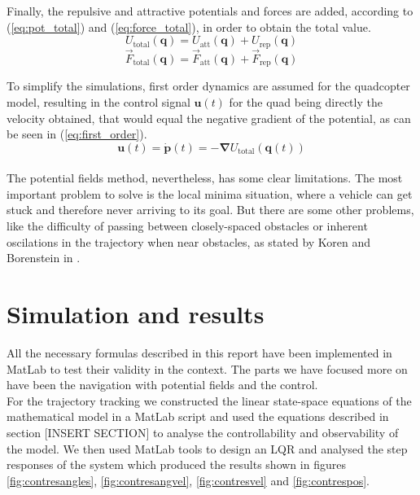 \documentclass[journal]{IEEEtran}
\newcommand*{\subb}[1]{_{\mathrm{#1}}}
\begin{document}
	Finally, the repulsive and attractive potentials and forces are added, according to (\ref{eq:pot_total}) and (\ref{eq:force_total}), in order to obtain the total value. 
	\begin{equation} \label{eq:pot_total}
	U\subb{total}(\bm{q}) = U\subb{att}(\bm{q}) + U\subb{rep}(\bm{q})
	\end{equation}
	\begin{equation} \label{eq:force_total}
	\vec{F}\subb{total}(\bm{q}) = \vec{F}\subb{att}(\bm{q}) + \vec{F}\subb{rep}(\bm{q})
	\end{equation}
	
	To simplify the simulations, first order dynamics are assumed for the quadcopter model, resulting in the control signal $\bm{u}(t)$ for the quad being directly the velocity obtained, that would equal the negative gradient of the potential, as can be seen in (\ref{eq:first_order}).
	\begin{equation} \label{eq:first_order}
	\bm{u}(t) = \bm{\dot p}(t) = -\bm{\nabla}U\subb{total}(\bm{q}(t))
	\end{equation}
	\\
	The potential fields method, nevertheless, has some clear limitations. The most important problem to solve is the local minima situation, where a vehicle can get stuck and therefore never arriving to its goal. But there are some other problems, like the difficulty of passing between closely-spaced obstacles or inherent oscilations in the trajectory when near obstacles, as stated by Koren and Borenstein in \cite{koren_pot_fields_limitations}. 
	
	\section{Simulation and results}
	All the necessary formulas described in this report have been implemented in MatLab to test their validity in the context. The parts we have focused more on have been the navigation with potential fields and the control.\\
	
	For the trajectory tracking we constructed the linear state-space equations of the mathematical model in a MatLab script and used the equations described in section [INSERT SECTION] to analyse the controllability and observability of the model.  We then used MatLab tools to design an LQR and analysed the step responses of the system which produced the results shown in figures \figurename{\ref{fig:contresangles}}, \figurename{\ref{fig:contresangvel}}, \figurename{\ref{fig:contresvel}} and \figurename{\ref{fig:contrespos}}.  \\
\end{document}
